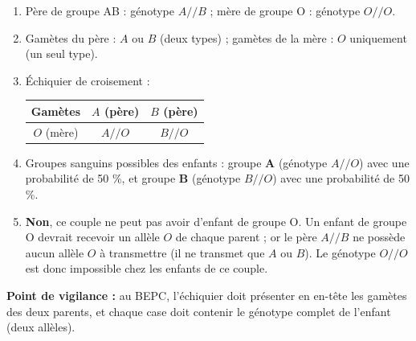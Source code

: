 \documentclass[11pt]{article}
\begin{document}
\begin{corrige}
\begin{enumerate}
\item Père de groupe AB : génotype $A//B$ ; mère de groupe O : génotype $O//O$.
\item Gamètes du père : $A$ ou $B$ (deux types) ; gamètes de la mère : $O$ uniquement (un seul type).
\item Échiquier de croisement :
\begin{center}
\begin{tabular}{|c|c|c|}
\hline
\rowcolor{popblueL} \textbf{Gamètes} & $A$ (père) & $B$ (père) \\
\hline
$O$ (mère) & $A//O$ & $B//O$ \\
\hline
\end{tabular}
\end{center}
\item Groupes sanguins possibles des enfants : groupe \textbf{A} (génotype $A//O$) avec une probabilité de 50 \%, et groupe \textbf{B} (génotype $B//O$) avec une probabilité de 50 \%.
\item \textbf{Non}, ce couple ne peut pas avoir d'enfant de groupe O. Un enfant de groupe O devrait recevoir un allèle $O$ de chaque parent ; or le père $A//B$ ne possède aucun allèle $O$ à transmettre (il ne transmet que $A$ ou $B$). Le génotype $O//O$ est donc impossible chez les enfants de ce couple.
\end{enumerate}
\textbf{Point de vigilance :} au BEPC, l'échiquier doit présenter en en-tête les gamètes des deux parents, et chaque case doit contenir le génotype complet de l'enfant (deux allèles).
\end{corrige}
\end{document}
